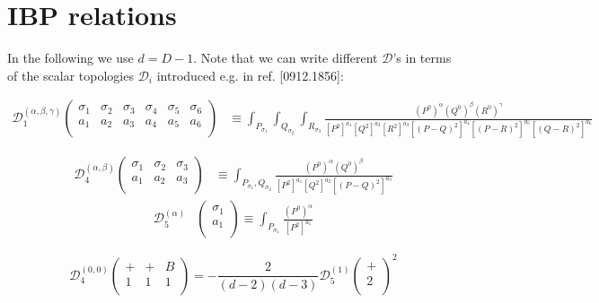 \section{IBP relations}
In the following we use $d=D-1$. 
Note that we can write different $\mathcal{D}$'s in terms of the scalar topologies $\mathcal{D}_i$ introduced e.g. in ref. [0912.1856]:

\begin{equation}
\begin{split}
\mathcal{D}_1^{(\alpha,\beta,\gamma)}
\begin{pmatrix}
\sigma_1 & \sigma_2 & \sigma_3 & \sigma_4 &  \sigma_5 & \sigma_6 \\
a_1 & a_2 & a_3 & a_4 & a_5 & a_6  \\
\end{pmatrix}
 & \equiv \int_{P_{\sigma_1}}\int_{Q_{\sigma_2}} \int_{R_{\sigma_3}}\frac{(P^0)^\alpha (Q^0)^\beta (R^0)^\gamma }{[P^{2}]^{a_1}[Q^{2}]^{a_2}[R^2]^{a_3}[(P-Q)^{2}]^{a_4}[(P-R)^{2}]^{a_5}[(Q-R)^{2}]^{a_6}} 
\end{split}
\end{equation}

\begin{equation}
\begin{split}
\mathcal{D}_4^{(\alpha,\beta)}
\begin{pmatrix}
\sigma_1 & \sigma_2 & \sigma_3 \\
a_1 & a_2 & a_3  \\
\end{pmatrix}
 & \equiv \int_{P_{\sigma_1},Q_{\sigma_2}} \frac{(P^0)^\alpha (Q^0)^\beta }{[P^{2}]^{a_1}[Q^{2}]^{a_2}[(P-Q)^{2}]^{a_3}}
\end{split}
\end{equation}
\begin{equation}
\begin{split}
\mathcal{D}_5^{(\alpha)}
&\begin{pmatrix}
\sigma_1 \\
a_1 \\
\end{pmatrix}
\equiv \int_{P_{\sigma_1}}  \frac{(P^0)^\alpha}{[P^{2}]^{a_1}}
\end{split}
\end{equation}


\begin{equation}
\mathcal{D}_4^{(0,0)}
\begin{pmatrix}
+ & + & B \\
1 & 1 & 1  \\
\end{pmatrix} = -\frac{2}{(d-2)(d-3)}\mathcal{D}_5^{(1)}
\begin{pmatrix}
+ \\
2  \\
\end{pmatrix}^2
\end{equation}

